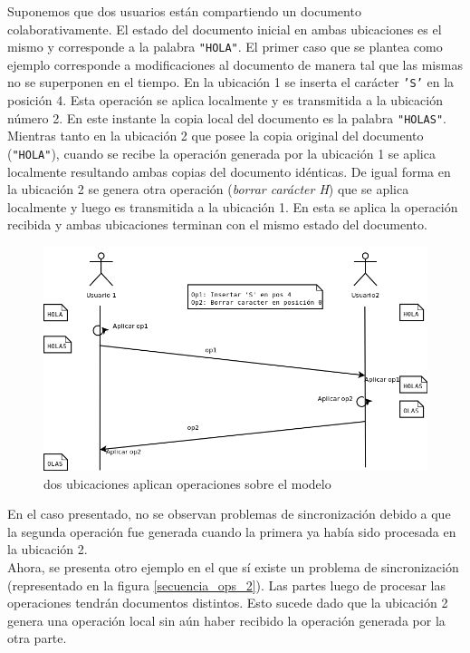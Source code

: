 \documentclass[12pt,a4paper]{article}
\begin{document}
	Suponemos que dos usuarios están compartiendo un documento colaborativamente. El estado del documento 
	inicial en ambas ubicaciones es el mismo y corresponde a la palabra \texttt{"HOLA"}.
	El primer caso que se plantea como ejemplo corresponde a modificaciones al documento de manera tal 
	que las mismas no se superponen en el tiempo.
	En la ubicación 1 se inserta el carácter \texttt{'S'} en la posición 4. Esta operación se aplica localmente
	y es transmitida a la ubicación número 2. En este instante la copia local del documento es
	la palabra \texttt{"HOLAS"}.
	Mientras tanto en la ubicación 2 que posee la copia original del documento (\texttt{"HOLA"}), cuando se recibe
	la operación generada por la ubicación 1 se aplica localmente resultando ambas copias del documento idénticas.
	De igual forma en la ubicación 2 se genera otra operación (\textit{borrar carácter H}) que se aplica localmente
	y luego es transmitida a la ubicación 1. En esta se aplica la operación recibida y ambas ubicaciones terminan 
	con el mismo estado del documento.

	\begin{figure}[!ht]
		\begin{center}
			\includegraphics[width=14cm]{sincronizacion_ok.png}
			\caption{\label{secuencia_ops_1} dos ubicaciones aplican operaciones sobre el modelo }
		\end{center}
	\end{figure}

	En el caso presentado, no se observan problemas de sincronización debido a que la segunda operación fue 
	generada cuando la primera ya había sido procesada en la ubicación 2. \\

	Ahora, se presenta otro ejemplo en el que sí existe un problema de sincronización (representado en la figura
	\ref{secuencia_ops_2}). Las partes luego de procesar las operaciones tendrán documentos distintos. Esto sucede dado
	que la ubicación 2 genera una operación local sin aún haber recibido la operación generada por la otra parte.
	
\end{document}
